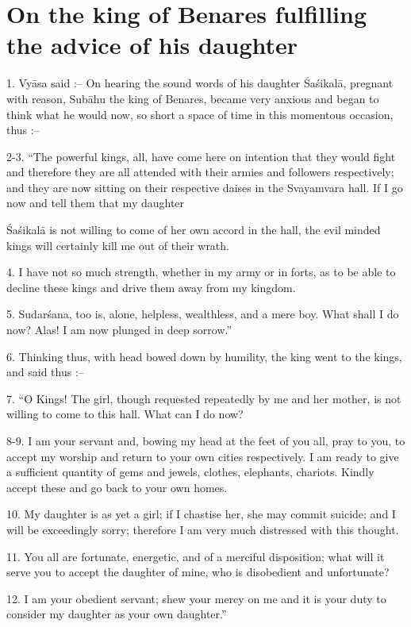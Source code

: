 \chapter{On the king of Benares fulfilling the advice of his daughter}

1. Vy\=asa said :-- On hearing the sound words of his daughter \'Sa\'sikal\=a, pregnant with reason, Sub\=ahu the king of Benares, became very anxious and began to think what he would now, so short a space of time in this momentous occasion, thus :--

2-3. ``The powerful kings, all, have come here on intention that they would fight and therefore they are all attended with their armies and followers respectively; and they are now sitting on their respective daises in the Svayamvara hall. If I go now and tell them that my daughter

\'Sa\'sikal\=a is not willing to come of her own accord in the hall, the evil minded kings will certainly kill me out of their wrath.

4. I have not so much strength, whether in my army or in forts, as to be able to decline these kings and drive them away from my kingdom.

5. Sudar\'sana, too is, alone, helpless, wealthless, and a mere boy. What shall I do now? Alas! I am now plunged in deep sorrow.''

6. Thinking thus, with head bowed down by humility, the king went to the kings, and said thus :--

7. ``O Kings! The girl, though requested repeatedly by me and her mother, is not willing to come to this hall. What can I do now?

8-9. I am your servant and, bowing my head at the feet of you all, pray to you, to accept my worship and return to your own cities respectively. I am ready to give a sufficient quantity of gems and jewels, clothes, elephants, chariots. Kindly accept these and go back to your own homes.

10. My daughter is as yet a girl; if I chastise her, she may commit suicide; and I will be exceedingly sorry; therefore I am very much distressed with this thought.

11. You all are fortunate, energetic, and of a merciful disposition; what will it serve you to accept the daughter of mine, who is disobedient and unfortunate?

12. I am your obedient servant; shew your mercy on me and it is your duty to consider my daughter as your own daughter.''

